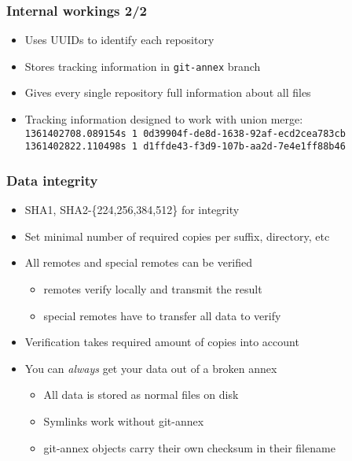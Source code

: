 \documentclass[t]{beamer}
\begin{document}
\begin{frame}
	\frametitle{Internal workings 2/2}
	\begin{itemize}
		\item Uses UUIDs to identify each repository
		\item Stores tracking information in \texttt{git-annex} branch
		\item Gives every single repository full information about all files
		\item Tracking information designed to work with union merge: \\
			{\footnotesize \texttt{1361402708.089154s 1 0d39904f-de8d-1638-92af-ecd2cea783cb}} \\
			{\footnotesize \texttt{1361402822.110498s 1 d1ffde43-f3d9-107b-aa2d-7e4e1ff88b46}}
	\end{itemize}
\end{frame}

\begin{frame}
	\frametitle{Data integrity}
	\begin{itemize}
		\item SHA1, SHA2-\{224,256,384,512\} for integrity
		\item Set minimal number of required copies per suffix, directory, etc
		\item All remotes and special remotes can be verified
		\begin{itemize}
			\item remotes verify locally and transmit the result
			\item special remotes have to transfer all data to verify
		\end{itemize}
		\item Verification takes required amount of copies into account
		\item You can \textit{always} get your data out of a broken annex
		\begin{itemize}
			\item All data is stored as normal files on disk
			\item Symlinks work without git-annex
			\item git-annex objects carry their own checksum in their filename
		\end{itemize}
	\end{itemize}
\end{frame}
\end{document}
